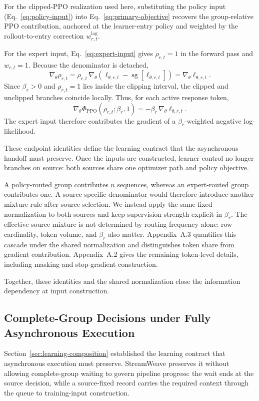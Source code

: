 \documentclass[letterpaper]{article}
\begin{document}
For the clipped-PPO realization used here, substituting the policy input (Eq.~\ref{eq:policy-input}) into Eq.~\ref{eq:primary-objective} recovers the group-relative PPO contribution, anchored at the learner-entry policy and weighted by the rollout-to-entry correction $w^{\mathrm{lag}}_{r,t}$.

For the expert input, Eq.~\ref{eq:expert-input} gives $\rho_{r,t}=1$ in the forward pass and $w_{r,t}=1$.
Because the denominator is detached,
\[
\nabla_\theta \rho_{r,t}
=
\rho_{r,t}\,\nabla_\theta\!\left(
\ell_{\theta,r,t}-\operatorname{sg}[\ell_{\theta,r,t}]
\right)
=
\nabla_\theta\ell_{\theta,r,t}.
\]
Since $\beta_r>0$ and $\rho_{r,t}=1$ lies inside the clipping interval, the clipped and unclipped branches coincide locally.
Thus, for each active response token,
\[
\nabla_\theta
\Phi_{\mathrm{PPO}}\!\left(\rho_{r,t};\beta_r,1\right)
=
-\beta_r\,\nabla_\theta\ell_{\theta,r,t}.
\]
The expert input therefore contributes the gradient of a $\beta_r$-weighted negative log-likelihood.

These endpoint identities define the learning contract that the asynchronous handoff must preserve.
Once the inputs are constructed, learner control no longer branches on source: both sources share one optimizer path and policy objective.

A policy-routed group contributes $n$ sequences, whereas an expert-routed group contributes one.
A source-specific denominator would therefore introduce another mixture rule after source selection.
We instead apply the same fixed normalization to both sources and keep supervision strength explicit in $\beta_r$.
The effective source mixture is not determined by routing frequency alone: row cardinality, token volume, and $\beta_r$ also matter.
Appendix~A.3 quantifies this cascade under the shared normalization and distinguishes token share from gradient contribution.
Appendix~A.2 gives the remaining token-level details, including masking and stop-gradient construction.

Together, these identities and the shared normalization close the information dependency at input construction.

\subsection{Complete-Group Decisions under Fully Asynchronous Execution}
\label{sec:async-execution}

Section~\ref{sec:learning-composition} established the learning contract that asynchronous execution must preserve.
StreamWeave preserves it without allowing complete-group waiting to govern pipeline progress: the wait ends at the source decision, while a source-fixed record carries the required context through the queue to training-input construction.
\end{document}
